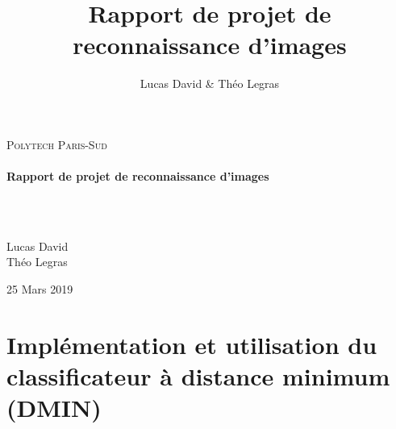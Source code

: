 \documentclass[12pt,a4paper]{article}
\author{Lucas David \& Théo Legras}
\title{Rapport de projet de reconnaissance d'images}
\date{}
\begin{document}
\begin{titlepage}
  \begin{sffamily}
  \begin{center}
    \textsc{\LARGE Polytech Paris-Sud}\\[2cm]
    \HRule \\[0.4cm]
    { \huge \bfseries Rapport de projet de reconnaissance d'images\\[0.4cm] }

    \HRule \\[2cm] \\

    \begin{minipage}{0.4\textwidth}
      \begin{center} \large
        Lucas David \\
        Théo Legras \\
      \end{center}
    \end{minipage}
    \vfill

    {\large 25\iem{} Mars 2019}

  \end{center}
  \end{sffamily}
\end{titlepage}

\newpage

\section{Implémentation et utilisation du classificateur à distance minimum (DMIN)}
\end{document}
